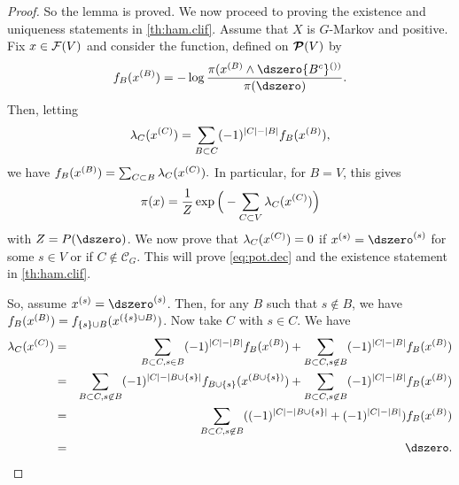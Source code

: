 \begin{proof}
So the lemma is proved. We now proceed to proving the existence and
uniqueness statements in 
\cref{th:ham.clif}. Assume that $X$ is $G$-Markov and positive. 
Fix $x \in {\mathcal F}(V)$ and consider the function, defined on ${\bm{\mathcal P}({V})}$ by
$$
f_B(\pe xB) = - \ln\frac{\pi(\pe xB\wedge \pe \dszero {B^c})}{\pi(\dszero)}.
$$
Then, letting
$$
\lambda_C(x^{(C)}) = \sum_{B \subset C} (-1)^{|C|-|B|} f_B(x^{(B)}),
$$
we have
$
f_B(x^{(B)}) = \sum_{C\subset B} \lambda_C(x^{(C)}).
$
In particular, for $B=V$, this gives 
$$
\pi( x) = \frac{1}{Z} \exp\Big(-\sum_{C\subset V}
\lambda_C(x^{(C)})\Big)
$$
with $Z =
P(\dszero)$.
We now prove that $\lambda_C(x^{(C)}) = 0$ if $\pe xs = \pe \dszero s$ for some $s\in V$ or if
$C\not \in \mathcal C_G$. This will prove
\cref{eq:pot.dec} and the existence statement in 
\cref{th:ham.clif}. 

So, assume $\pe xs = \pe \dszero s$. Then, for any $B$ such that $s\not\in B$, we
have $f_B (x^{(B)})= f_{\{s\}\cup B}(x^{(\{s\}\cup B)})$. Now take $C$ with $s\in C$. We have
\begin{eqnarray*}
\la_C(\pe xC) &=& \sum_{B \sub C, s\in B} (-1)^{|C|-|B|} f_B(\pe xB) + \sum_{B
\sub C, s\not \in B} (-1)^{|C|-|B|} f_B(\pe xB)\\
&=& \sum_{B \sub C, s\not \in B} (-1)^{|C|-|B\cup\{s\}|} f_{B\cup\{s\}}(\pe x {B\cup\{s\}}) + \sum_{B
\sub C, s\not \in B} (-1)^{|C|-|B|} f_B(\pe xB)\\
&=& \sum_{B \sub C, s\not \in B} ((-1)^{|C|-|B\cup\{s\}|} + (-1)^{|C|-|B|}) f_B(\pe xB)\\
&=&\dszero.
\end{eqnarray*}


\end{proof}
